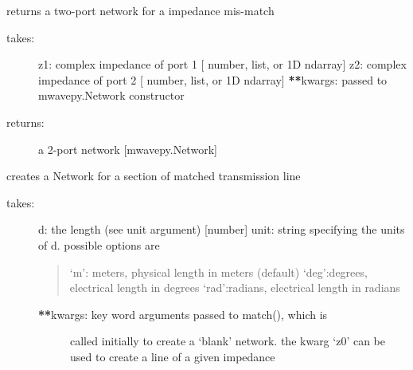 \documentclass[letterpaper,10pt,english]{sphinxmanual}
\begin{document}
\begin{fulllineitems}
\begin{fulllineitems}
\begin{description}
\end{description}

\end{fulllineitems}


\begin{fulllineitems}
\label{auto_workingband:mwavepy.WorkingBand.impedance_mismatch}
returns a two-port network for a impedance mis-match
\begin{description}
\item[{takes:}] \leavevmode
z1: complex impedance of port 1 {[} number, list, or 1D ndarray{]}
z2: complex impedance of port 2 {[} number, list, or 1D ndarray{]}
{\color{red}\bfseries{}**}kwargs: passed to mwavepy.Network constructor

\item[{returns:}] \leavevmode
a 2-port network {[}mwavepy.Network{]}

\end{description}

\end{fulllineitems}


\begin{fulllineitems}
\label{auto_workingband:mwavepy.WorkingBand.line}
creates a Network for a section of matched transmission line
\begin{description}
\item[{takes:}] \leavevmode
d: the length (see unit argument) {[}number{]}
unit: string specifying the units of d. possible options are
\begin{quote}

`m': meters, physical length in meters (default)
`deg':degrees, electrical length in degrees
`rad':radians, electrical length in radians
\end{quote}
\begin{description}
\item[{{\color{red}\bfseries{}**}kwargs: key word arguments passed to match(), which is }] \leavevmode
called initially to create a `blank' network. the kwarg
`z0' can be used to create a line of a given impedance

\end{description}


\end{description}
\end{fulllineitems}
\end{fulllineitems}
\end{document}
